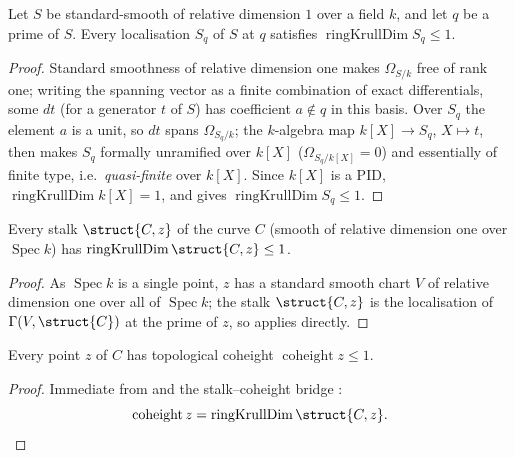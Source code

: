 \begin{lemma}
  \label{lem:adelic_relDimOne_dim_le_one}
  \leanok
  Let \(S\) be standard-smooth of relative dimension \(1\) over a field
  \(k\), and let \(q\) be a prime of \(S\). Every localisation \(S_q\)
  of \(S\) at \(q\) satisfies \(\operatorname{ringKrullDim} S_q \le 1\).
\end{lemma}
\begin{proof}
  \leanok
  Standard smoothness of relative dimension one makes \(\Omega_{S/k}\)
  free of rank one; writing the spanning vector as a finite combination
  of exact differentials, some \(dt\) (for a generator \(t\) of \(S\))
  has coefficient \(a \notin q\) in this basis. Over \(S_q\) the element
  \(a\) is a unit, so \(dt\) spans \(\Omega_{S_q/k}\); the \(k\)-algebra
  map \(k[X] \to S_q\), \(X \mapsto t\), then makes \(S_q\) formally
  unramified over \(k[X]\) (\(\Omega_{S_q/k[X]} = 0\)) and essentially
  of finite type, i.e.\ \emph{quasi-finite} over \(k[X]\). Since
  \(k[X]\) is a PID, \(\operatorname{ringKrullDim} k[X] = 1\), and
   gives
  \(\operatorname{ringKrullDim} S_q \le 1\).
\end{proof}

\begin{lemma}
  \label{lem:adelic_curve_stalk_dim_le_one}
  \leanok
  Every stalk \(\struct{C, z}\) of the curve \(C\) (smooth of relative
  dimension one over \(\operatorname{Spec} k\)) has
  \(\operatorname{ringKrullDim} \struct{C, z} \le 1\).
\end{lemma}
\begin{proof}
  \leanok
  As \(\operatorname{Spec} k\) is a single point, \(z\) has a standard
  smooth chart \(V\) of relative dimension one over all of
  \(\operatorname{Spec} k\); the stalk \(\struct{C, z}\) is the
  localisation of \(\Gamma(V, \struct{C})\) at the prime of \(z\), so
   applies directly.
\end{proof}

\begin{lemma}
  \label{lem:adelic_curve_coheight_le_one}
  \leanok
  Every point \(z\) of \(C\) has topological coheight
  \(\operatorname{coheight} z \le 1\).
\end{lemma}
\begin{proof}
  \leanok
  Immediate from  and the
  stalk--coheight bridge :
  \[
    \operatorname{coheight}z
      =\operatorname{ringKrullDim}\struct{C,z}.
  \]
\end{proof}

